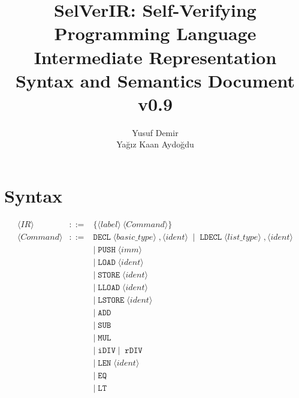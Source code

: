 \documentclass{article}
\title{SelVerIR: Self-Verifying Programming Language \\ Intermediate Representation Syntax and Semantics Document \\ v0.9}
\author{Yusuf Demir \\ Yağız Kaan Aydoğdu}
\begin{document}
\maketitle


\newpage
\section{Syntax}

\[
\begin{array}{rcl}

\langle \mathit{IR} \rangle &::=& \{\langle \mathit{label} \rangle\ \langle \mathit{Command} \rangle\} \\[6pt]

\langle \mathit{Command} \rangle
&::=& \texttt{DECL} \; \langle basic\_type \rangle \; , \langle ident \rangle \;\mid\; \texttt{LDECL} \; \langle list\_type \rangle \; , \langle ident \rangle
\\[2pt]

&& \mid\; \texttt{PUSH} \; \langle imm \rangle
\\[2pt]

&& \mid\; \texttt{LOAD} \; \langle ident \rangle
\\[2pt]

&& \mid\; \texttt{STORE} \; \langle ident \rangle
\\[2pt]

&& \mid\; \texttt{LLOAD} \; \langle ident \rangle
\\[2pt]

&& \mid\; \texttt{LSTORE} \; \langle ident \rangle
\\[2pt]

&& \mid\; \texttt{ADD}
\\[2pt]

&& \mid\; \texttt{SUB}
\\[2pt]

&& \mid\; \texttt{MUL}
\\[2pt]

&& \mid\; \texttt{iDIV} \mid\; \texttt{rDIV}
\\[2pt]

&& \mid\; \texttt{LEN} \; \langle ident \rangle
\\[2pt]

&& \mid\; \texttt{EQ}
\\[2pt]

&& \mid\; \texttt{LT}
\\[2pt]


\end{array}\]
\end{document}

